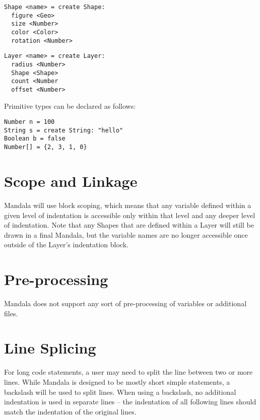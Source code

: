 \documentclass[12pt]{report}
\begin{document}
\begin{verbatim}
Shape <name> = create Shape:
  figure <Geo>
  size <Number>
  color <Color>
  rotation <Number>
\end{verbatim}

\begin{verbatim}
Layer <name> = create Layer:
  radius <Number>
  Shape <Shape>
  count <Number
  offset <Number> 
\end{verbatim}

\noindent
Primitive types can be declared as follows:

\begin{verbatim}
Number n = 100
String s = create String: "hello" 
Boolean b = false
Number[] = {2, 3, 1, 0}
\end{verbatim}

\newpage
{}
\section*{Scope and Linkage}

Mandala will use block scoping, which means that any variable defined within a given level of indentation is accessible only within that level and any deeper level of indentation. Note that any Shapes that are defined within a Layer will still be drawn in a final Mandala, but the variable names are no longer accessible once outside of the Layer's indentation block.

\section*{Pre-processing}

Mandala does not support any sort of pre-processing of variables or additional files.

\section*{Line Splicing}

For long code statements, a user may need to split the line between two or more lines. While Mandala is designed to be mostly short simple statements, a backslash will be used to split lines. When using a backslash, no additional indentation is used in separate lines -- the indentation of all following lines should match the indentation of the original lines.
\end{document}
